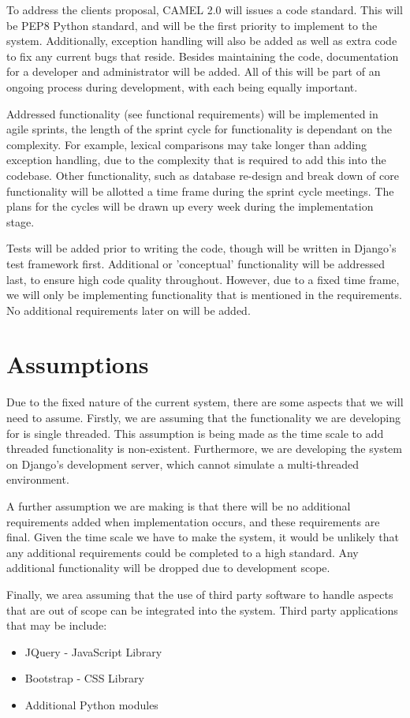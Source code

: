 \documentclass[12pt]{article}
\begin{document}
	To address the clients proposal, CAMEL 2.0 will issues a code standard. This will be PEP8 Python standard, and will be the first priority to implement to the system. Additionally, exception handling will also be added as well as extra code to fix any current bugs that reside. Besides maintaining the code, documentation for a developer and administrator will be added. All of this will be part of an ongoing process during development, with each being equally important.   
	
	Addressed functionality (see  functional requirements) will be implemented in agile sprints, the length of the sprint cycle for functionality is dependant on the complexity. For example, lexical comparisons may take longer than adding exception handling, due to the complexity that is required to add this into the codebase. Other functionality, such as database re-design and break down of core functionality will be allotted a time frame during the sprint cycle meetings. The plans for the cycles will be drawn up every week during the implementation stage.   
	
	Tests will be added prior to writing the code, though will be written in Django's test framework first. Additional or 'conceptual' functionality will be addressed last, to ensure high code quality throughout. However, due to a fixed time frame, we will only be implementing functionality that is mentioned in the requirements. No additional requirements later on will be added.          	
	\section{Assumptions}
	Due to the fixed nature of the current system, there are some aspects that we will need to assume. Firstly, we are assuming that the functionality we are developing for is single threaded. This assumption is being made as the time scale to add threaded functionality is non-existent. Furthermore, we are developing the system on Django's development server, which cannot simulate a multi-threaded environment. 
	
	A further assumption we are making is that there will be no additional requirements added when implementation occurs, and these requirements are final. Given the time scale we have to make the system, it would be unlikely that any additional requirements could be completed to a high standard. Any additional functionality will be dropped due to development scope. 
	
	Finally, we area assuming that the use of third party software to handle aspects that are out of scope can be integrated into the system. Third party applications that may be include:
	\begin{itemize}
		\item JQuery - JavaScript Library
		\item Bootstrap - CSS Library
		\item Additional Python modules
	\end{itemize}
\end{document}
